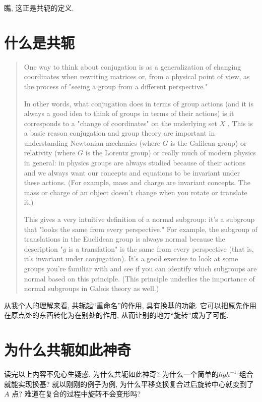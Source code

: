 \documentclass{ctexrep}
\begin{document}
瞧, 这正是共轭的定义.

\section{什么是共轭}

\begin{quotation}
    One way to think about conjugation is as a
    generalization of changing coordinates when rewriting
    matrices or, from a physical point of view, as the
    process of "seeing a group from a different perspective."

    In other words, what conjugation does in terms of group
    actions (and it is always a good idea to think of groups in
    terms of their actions) is it corresponds to a "change of
    coordinates" on the underlying set \(X\)
    . This is a basic reason conjugation and group theory are
    important in understanding Newtonian mechanics (where \(G\)
    is the Galilean group) or relativity (where \(G\)
    is the Lorentz group) or really much of modern physics in
    general: in physics groups are always studied because of
    their actions and we always want our concepts and equations
    to be invariant under these actions. (For example, mass and
        charge are invariant concepts. The mass or charge of an
    object doesn't change when you rotate or translate it.)

    This gives a very intuitive definition of a normal
    subgroup: it's a subgroup that "looks the same from every
    perspective." For example, the subgroup of translations in
    the Euclidean group is always normal because the
    description "\(g\)
    is a translation" is the same from every perspective (that
    is, it's invariant under conjugation). It's a good exercise
    to look at some groups you're familiar with and see if you
    can identify which subgroups are normal based on this
    principle. (This principle underlies the importance of
    normal subgroups in Galois theory as well.)
\end{quotation}

从我个人的理解来看, 共轭起``重命名''的作用, 具有换基的功能.
它可以把原先作用在原点处的东西转化为在别处的作用, 从而让别的地方``旋转''成为了可能.

\section{为什么共轭如此神奇}
读完以上内容不免心生疑惑, 为什么共轭如此神奇? 为什么一个简单的\(hgh^{-1}\) 组合就能实现换基?
就以刚刚的例子为例, 为什么平移变换复合过后旋转中心就变到了\(A\) 点? 难道在复合的过程中旋转不会变形吗?
\end{document}
